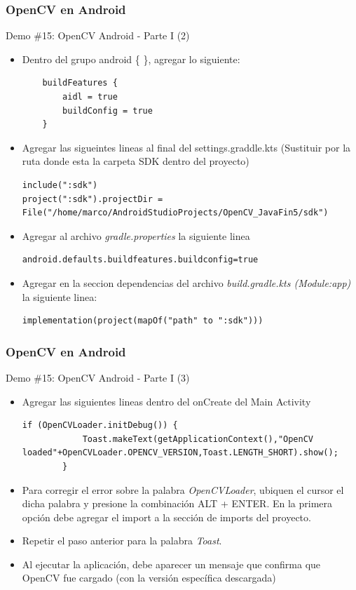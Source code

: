 \documentclass[aspectratio=169,compress]{beamer}
\begin{document}
\begin{frame}[fragile]
\frametitle{OpenCV en Android}
\begin{block}{Demo \#15: OpenCV Android - Parte I (2)}
\begin{itemize}
\item Dentro del grupo android \{ \}, agregar lo siguiente:
\begin{verbatim}
    buildFeatures {
        aidl = true
        buildConfig = true
    }
\end{verbatim}
\item Agregar las sigueintes lineas al final del settings.graddle.kts (Sustituir por la ruta donde esta la carpeta SDK dentro del proyecto)
\begin{verbatim}
include(":sdk")
project(":sdk").projectDir = File("/home/marco/AndroidStudioProjects/OpenCV_JavaFin5/sdk")
\end{verbatim}

\item Agregar al archivo \textit{gradle.properties} la siguiente linea
\begin{verbatim}
android.defaults.buildfeatures.buildconfig=true
\end{verbatim}

\item Agregar en la seccion dependencias del archivo \textit{build.gradle.kts (Module:app)} la siguiente linea:
\begin{verbatim}
implementation(project(mapOf("path" to ":sdk")))
\end{verbatim}
\end{itemize}
\end{block}
\end{frame}


\begin{frame}[fragile]
\frametitle{OpenCV en Android}
\begin{block}{Demo \#15: OpenCV Android  - Parte I (3)}
\begin{itemize}

\item Agregar las siguientes lineas dentro del onCreate del Main Activity
\begin{verbatim}
if (OpenCVLoader.initDebug()) {
            Toast.makeText(getApplicationContext(),"OpenCV loaded"+OpenCVLoader.OPENCV_VERSION,Toast.LENGTH_SHORT).show();
        }
\end{verbatim}
\item Para corregir el error sobre la palabra \textit{OpenCVLoader}, ubiquen el cursor el dicha palabra y presione la combinación ALT + ENTER. En la primera opción debe agregar el import a la sección de imports del proyecto.
\item Repetir el paso anterior para la palabra \textit{Toast}.
\item Al ejecutar la aplicación, debe aparecer un mensaje que confirma que OpenCV fue cargado (con la versión específica descargada)
\end{itemize}
\end{block}
\end{frame}
\end{document}

